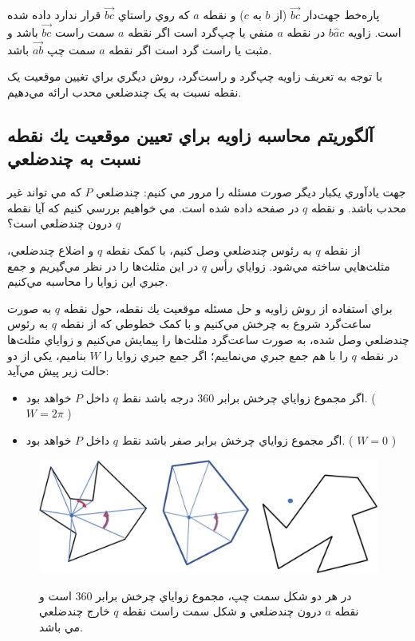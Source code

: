 \documentclass{book}
\begin{document}
پاره‌خط جهت‌دار $\vec{bc}$ (از $b$ به $c$) و نقطه  $a$ که روي راستاي $\vec{bc}$  قرار ندارد داده شده است. زاويه $b\hat{a}c$  در نقطه $a$ منفي يا چپ‌گرد است اگر نقطه $a$ سمت راست  $\vec{bc}$ باشد و مثبت يا راست گرد است اگر نقطه $a$ سمت چپ‌ $\vec{ab}$ باشد.

با توجه به تعريف زاويه چپ‌گرد و راست‌گرد، روش ديگري براي تغيين موقعيت يک نقطه نسبت به يک چندضلعي محدب ارائه مي‌دهيم. 

\subsection{آلگوريتم محاسبه زاويه براي تعيين موقعيت يك نقطه نسبت به چندضلعي}

جهت يادآوري يکبار ديگر صورت مسئله را مرور مي کنيم:
چندضلعي $P$ که مي تواند غير محدب باشد. و نقطه $q$ در صفحه داده شده است. مي خواهيم بررسي کنيم که آيا نقطه $q$ درون چندضلعي است؟

از نقطه $q$ به رئوس چندضلعي وصل کنيم، با کمک نقطه $q$ و اضلاع چندضلعي، مثلث‌هايي ساخته مي‌شود. زواياي رأس $q$ در اين مثلث‌ها را در نظر مي‌گيريم و جمع جبري اين زوايا را محاسبه مي‌کنيم.

براي استفاده از روش زاويه و حل مسئله موقعيت يك نقطه، حول نقطه $q$ به صورت ساعت‌گرد شروع به چرخش مي‌کنيم و با کمک خطوطي که از نقطه $q$  به رئوس چندضلعي وصل شده، به صورت ساعت‌گرد مثلث‌ها را پيمايش مي‌کنيم و زواياي مثلث‌ها در نقطه $q$  را با هم جمع جبري مي‌نماييم؛ اگر جمع جبري زوايا را $W$ بناميم، يکي از دو حالت زير پيش مي‌آيد:

\begin{itemize}
    \item
    اگر مجموع زواياي چرخش برابر 360 درجه باشد نقط $q$ داخل $P$ خواهد بود. ( $W=2\pi$ )
    \item
    اگر مجموع زواياي چرخش برابر صفر باشد نقط $q$ داخل $P$ خواهد بود. ( $W=0$ )
\end{itemize}

\begin{figure}[h!]
    \begin{center}
        \includegraphics[width=\linewidth]{point_angle.jpg}
        \label{point_angle}
        \caption{ در هر دو شکل سمت چپ، مجموع زواياي چرخش برابر 360 است و نقطه $a$ درون چندضلعي و شکل سمت راست نقطه $q$ خارج چندضلعي مي باشد.}
    \end{center}
\end{figure}
\end{document}
